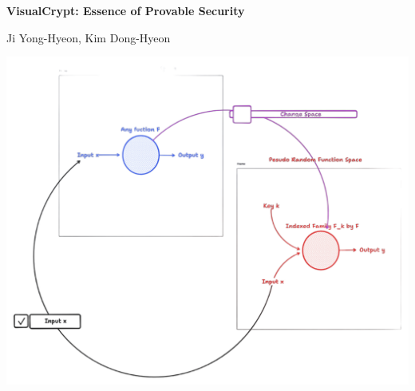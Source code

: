 \documentclass[12pt,openany]{book}
\theoremstyle{definition}
\begin{document}
	
	\begin{titlepage}
		\begin{center}
			{\Huge\textsf{\textbf{VisualCrypt: Essence of Provable Security}}\par}
			\vspace{0.5in}
			{\Large Ji Yong-Hyeon, Kim Dong-Hyeon\par}
			\vspace{1in}
			\includegraphics[scale=.3]{title2.png}\par
%					
%					

\end{center}
\end{titlepage}
\end{document}
